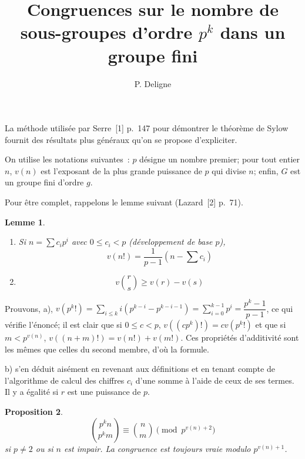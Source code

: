 \documentclass[12pt]{amsart}
\title{Congruences sur le nombre de sous-groupes d'ordre $p^k$ dans un groupe fini}
\author{P. Deligne}
\date{}
\theoremstyle{plain}
\newtheorem{lemme}{Lemme}
\newtheorem{proposition}[lemme]{Proposition}
\begin{document}
\maketitle
\thispagestyle{empty}

La méthode utilisée par Serre~[1] p.~147 pour démontrer le théorème de Sylow fournit des résultats plus généraux qu'on se propose d'expliciter.

On utilise les notations suivantes~: $p$ désigne un nombre premier; pour tout entier $n$, $v(n)$ est l'exposant de la plus grande puissance de $p$ qui divise $n$; enfin, $G$ est un groupe fini d'ordre $g$.

Pour être complet, rappelons le lemme suivant (Lazard~[2] p.~71).

\begin{lemme}\ \par
\begin{enumerate}
\item[a)] Si $n = \sum c_i p^i$ avec $0 \leqslant c_i < p$ (développement de base $p$),
\[
v(n!) = \frac{1}{p-1}(n - \textstyle\sum c_i)
\]
\item[b)]
\[
v\binom{r}{s} \geqslant v(r) - v(s)
\]
\end{enumerate}
\end{lemme}

Prouvons, a), $v(p^k!) = \sum_{i \leqslant k} i(p^{k-i} - p^{k-i-1}) = \sum_{i=0}^{k-1} p^i = \dfrac{p^k-1}{p-1}$, ce qui vérifie l'énoncé; il est clair que si $0 \leqslant c < p$, $v((cp^k)!) = cv(p^k!)$ et que si $m < p^{v(n)}$, $v((n+m)!) = v(n!) + v(m!)$. Ces propriétés d'additivité sont les mêmes que celles du second membre, d'où la formule.

b) s'en déduit aisément en revenant aux définitions et en tenant compte de l'algorithme de calcul des chiffres $c_i$ d'une somme à l'aide de ceux de ses termes. Il y a égalité si $r$ est une puissance de $p$.

\begin{proposition}
\[
\binom{p^k n}{p^k m} \equiv \binom{n}{m} \pmod{p^{v(n)+2}}
\]
si $p \neq 2$ ou si $n$ est impair. La congruence est toujours vraie modulo $p^{v(n)+1}$.
\end{proposition}
\end{document}
